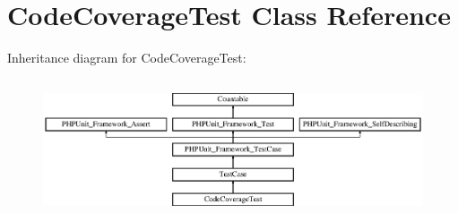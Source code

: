 \hypertarget{class_sebastian_bergmann_1_1_code_coverage_1_1_code_coverage_test}{}\section{Code\+Coverage\+Test Class Reference}
\label{class_sebastian_bergmann_1_1_code_coverage_1_1_code_coverage_test}
Inheritance diagram for Code\+Coverage\+Test\+:\begin{figure}[H]
\begin{center}
\leavevmode
\includegraphics[height=4.129793cm]{class_sebastian_bergmann_1_1_code_coverage_1_1_code_coverage_test}
\end{center}
\end{figure}
